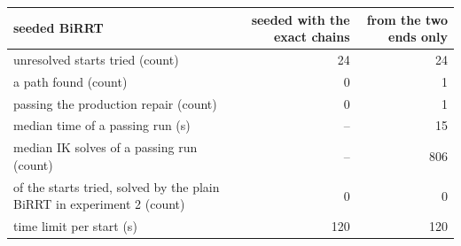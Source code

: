 \begin{tabular}{@{}>{\raggedright\arraybackslash}p{7.4cm} rr@{}}
\toprule
seeded BiRRT & seeded with the exact chains & from the two ends only \\
\midrule
unresolved starts tried (count) & 24 & 24 \\
a path found (count) & 0 & 1 \\
\quad passing the production repair (count) & 0 & 1 \\
median time of a passing run (s) & -- & 15 \\
median IK solves of a passing run (count) & -- & 806 \\
of the starts tried, solved by the plain BiRRT in experiment 2 (count) & 0 & 0 \\
time limit per start (s) & 120 & 120 \\
\bottomrule
\end{tabular}
